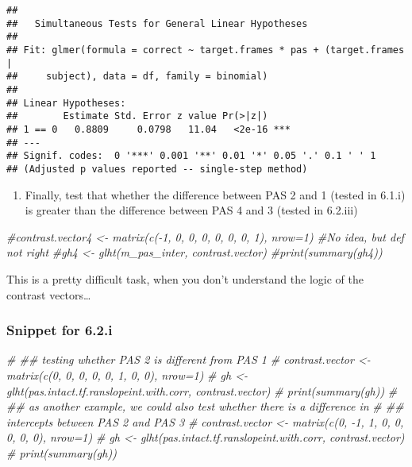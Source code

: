 \documentclass[
]{article}
\newenvironment{Shaded}{\begin{snugshade}}{\end{snugshade}}
\newcommand{\CommentTok}[1]{\textcolor[rgb]{0.56,0.35,0.01}{\textit{#1}}}
\providecommand{\tightlist}{%
  \setlength{\itemsep}{0pt}\setlength{\parskip}{0pt}}
\begin{document}
\begin{verbatim}
## 
##   Simultaneous Tests for General Linear Hypotheses
## 
## Fit: glmer(formula = correct ~ target.frames * pas + (target.frames | 
##     subject), data = df, family = binomial)
## 
## Linear Hypotheses:
##        Estimate Std. Error z value Pr(>|z|)    
## 1 == 0   0.8809     0.0798   11.04   <2e-16 ***
## ---
## Signif. codes:  0 '***' 0.001 '**' 0.01 '*' 0.05 '.' 0.1 ' ' 1
## (Adjusted p values reported -- single-step method)
\end{verbatim}

\begin{enumerate}
\def\labelenumi{\arabic{enumi})}
\setcounter{enumi}{2}
\tightlist
\item
  Finally, test that whether the difference between PAS 2 and 1 (tested
  in 6.1.i) is greater than the difference between PAS 4 and 3 (tested
  in 6.2.iii)
\end{enumerate}

\begin{Shaded}
\begin{Highlighting}[]
\CommentTok{\#contrast.vector4 \textless{}{-} matrix(c({-}1, 0, 0, 0, 0, 0, 0, 1), nrow=1) \#No idea, but def not right}
\CommentTok{\#gh4 \textless{}{-} glht(m\_pas\_inter, contrast.vector)}
\CommentTok{\#print(summary(gh4))}
\end{Highlighting}
\end{Shaded}

This is a pretty difficult task, when you don't understand the logic of
the contrast vectors\ldots{}

\hypertarget{snippet-for-6.2.i}{%
\subsubsection{Snippet for 6.2.i}\label{snippet-for-6.2.i}}

\begin{Shaded}
\begin{Highlighting}[]
\CommentTok{\# \#\# testing whether PAS 2 is different from PAS 1}
\CommentTok{\# contrast.vector \textless{}{-} matrix(c(0, 0, 0, 0, 0, 1, 0, 0), nrow=1)}
\CommentTok{\# gh \textless{}{-} glht(pas.intact.tf.ranslopeint.with.corr, contrast.vector)}
\CommentTok{\# print(summary(gh))}
\CommentTok{\# \#\# as another example, we could also test whether there is a difference in}
\CommentTok{\# \#\# intercepts between PAS 2 and PAS 3}
\CommentTok{\# contrast.vector \textless{}{-} matrix(c(0, {-}1, 1, 0, 0, 0, 0, 0), nrow=1)}
\CommentTok{\# gh \textless{}{-} glht(pas.intact.tf.ranslopeint.with.corr, contrast.vector)}
\CommentTok{\# print(summary(gh))}
\end{Highlighting}
\end{Shaded}
\end{document}
